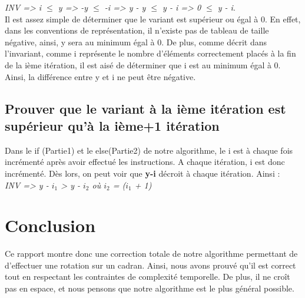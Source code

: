 \documentclass[a4paper, 12pt]{article}
\begin{document}
\textit{INV => i $\le$ y => -y $\le$ -i => y - y $\le$ y - i => 0 $\le$ y - i}. \\

Il est assez simple de déterminer que le variant est supérieur ou égal à 0. En effet, dans les conventions de représentation, il n'existe pas de tableau de taille négative, ainsi, y sera au minimum égal à 0. De plus, comme décrit dans l'invariant, comme i représente le nombre d'éléments correctement placés à la fin de la ième itération, il est aisé de déterminer que i est au minimum égal à 0. Ainsi, la différence entre y et i ne peut être négative. 

\subsection{Prouver que le variant à la ième itération est supérieur qu'à la ième+1 itération}
Dans le if (Partie1) et le else(Partie2) de notre algorithme, le i est à chaque fois incrémenté après avoir effectué les instructions. A chaque itération, i est donc incrémenté. Dès lors, on peut voir que \textbf{y-i} décroit à chaque itération.
Ainsi : \\

\textit{INV => y - $i_{1}$ > y - $i_{2}$ où $i_{2}$ = ($i_{1}$ + 1)}


\section{Conclusion}
Ce rapport montre donc une correction totale de notre algorithme permettant de d'effectuer une rotation sur un cadran. Ainsi, nous avons prouvé qu'il est correct tout en respectant les contraintes de complexité temporelle. De plus, il ne croît pas en espace, et nous pensons que notre algorithme est le plus général possible.
\end{document}
